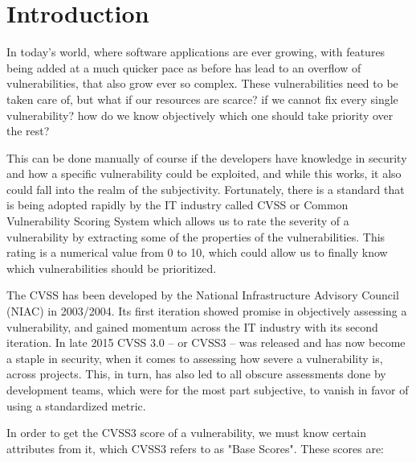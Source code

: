 
\chapter{Introduction}\label{chapter:Introduction}

In today's world, where software applications are ever growing, with features being added at a much quicker pace as before has lead to an overflow of vulnerabilities, that also grow ever so complex. These vulnerabilities need to be taken care of, but what if our resources are scarce? if we cannot fix every single vulnerability? how do we know objectively which one should take priority over the rest?

This can be done manually of course if the developers have knowledge in security and how a specific vulnerability could be exploited, and while this works, it also could fall into the realm of the subjectivity. Fortunately, there is a standard that is being adopted rapidly by the IT industry called CVSS or Common Vulnerability Scoring System \parencite{cvss3} which allows us to rate the severity of a vulnerability by extracting some of the properties of the vulnerabilities. This rating is a numerical value from 0 to 10, which could allow us to finally know which vulnerabilities should be prioritized. 

The CVSS has been developed by the National Infrastructure Advisory Council (NIAC) in 2003/2004. Its first iteration showed promise in objectively assessing a vulnerability, and gained momentum across the IT industry with its second iteration. In late 2015 CVSS 3.0 -- or CVSS3 -- was released and has now become a staple in security, when it comes to assessing how severe a vulnerability is, across projects. This, in turn, has also led to all obscure assessments done by development teams, which were for the most part subjective, to vanish in favor of using a standardized metric.

In order to get the CVSS3 score of a vulnerability, we must know certain attributes from it, which CVSS3 refers to as "Base Scores"\parencite{cvss3}. These scores are:

